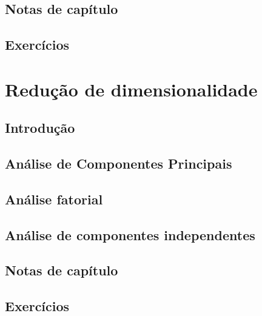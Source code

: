 \documentclass[
]{latex/krantz}
\theoremstyle{definition}
\theoremstyle{definition}
\theoremstyle{definition}
\theoremstyle{definition}
\theoremstyle{remark}
\begin{document}
\hypertarget{notas-de-capuxedtulo-11}{%
\section{Notas de capítulo}\label{notas-de-capuxedtulo-11}}

\hypertarget{exercuxedcios-11}{%
\section{Exercícios}\label{exercuxedcios-11}}

\hypertarget{reduuxe7uxe3o-de-dimensionalidade}{%
\chapter{Redução de dimensionalidade}\label{reduuxe7uxe3o-de-dimensionalidade}}

\hypertarget{introduuxe7uxe3o-12}{%
\section{Introdução}\label{introduuxe7uxe3o-12}}

\hypertarget{anuxe1lise-de-componentes-principais}{%
\section{Análise de Componentes Principais}\label{anuxe1lise-de-componentes-principais}}

\hypertarget{anuxe1lise-fatorial}{%
\section{Análise fatorial}\label{anuxe1lise-fatorial}}

\hypertarget{anuxe1lise-de-componentes-independentes}{%
\section{Análise de componentes independentes}\label{anuxe1lise-de-componentes-independentes}}

\hypertarget{notas-de-capuxedtulo-12}{%
\section{Notas de capítulo}\label{notas-de-capuxedtulo-12}}

\hypertarget{exercuxedcios-12}{%
\section{Exercícios}\label{exercuxedcios-12}}
\end{document}
